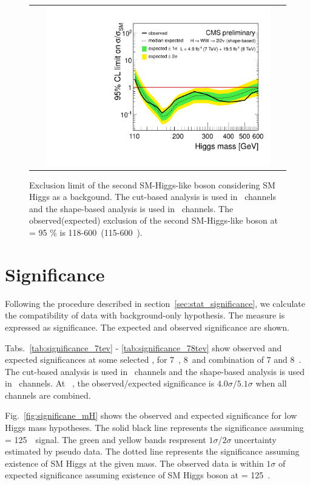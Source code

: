 \begin{figure}[htp] 
\centering 
\begin{tabular}{c} 
\includegraphics[width=0.9\textwidth]{figures/ana_Moriond13_2D_SMH_7p8TeV_bdt_from110to600_logx1_logy1.pdf} 
\end{tabular} 
\caption{Exclusion limit of the second SM-Higgs-like boson considering SM Higgs as a backgound.
The cut-based analysis is used in \SF\ channels and the shape-based analysis is used in 
\DF\ channels.
The observed(expected) exclusion of the second SM-Higgs-like boson at \CLs = 95 \% 
is 118-600~\GeV(115-600~\GeV).} 
\label{fig:limit78_secondhiggs} 
\end{figure} 




\section{Significance}

Following the procedure described in section~\ref{sec:stat_significance}, 
we calculate the compatibility of data with background-only hypothesis. 
The measure is expressed as significance. 
The expected and observed significance are shown. 

Tabs.~\ref{tab:significance_7tev} - \ref{tab:significance_78tev}  
show observed and expected significances at some selected \mHi, 
for 7~\TeV, 8~\TeV and combination of 7 and 8~\TeV.
The cut-based analysis is used in \SF\ channels 
and the shape-based analysis is used in \DF\ channels.
At ~\GeV, the observed/expected significance
is $4.0\sigma/5.1\sigma$ when all channels are combined.

Fig.~\ref{fig:significane_mH} shows the observed and expected 
significance for low Higgs mass hypotheses. 
The solid black line represents the significance assuming \mHi = 125~\GeV\ signal. 
The green and yellow bands respresent $1\sigma$/$2\sigma$ uncertainty 
estimated by pseudo data. The dotted line represents the significance 
assuming existence of SM Higgs at the given mass. 
The observed data is within $1\sigma$ of expected significance 
assuming existence of SM Higgs boson at \mHi = 125~\GeV.


